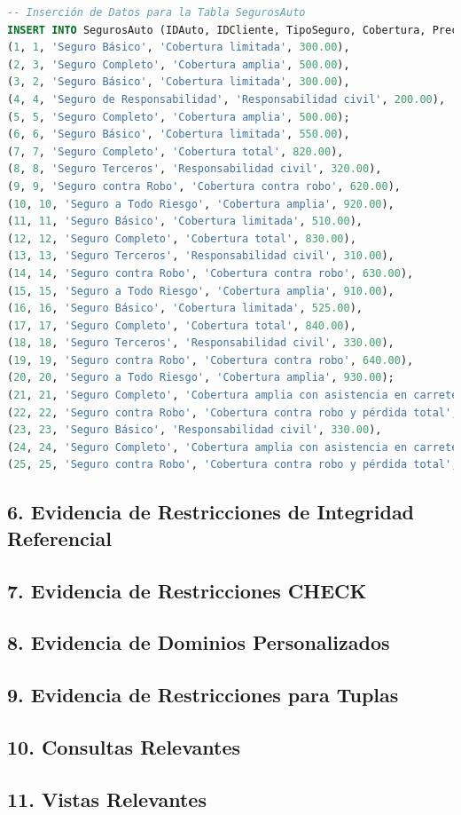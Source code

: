 \documentclass[12pt]{article}
\begin{document}
\begin{lstlisting}[language=SQL]
-- Inserción de Datos para la Tabla SegurosAuto
INSERT INTO SegurosAuto (IDAuto, IDCliente, TipoSeguro, Cobertura, Precio) VALUES
(1, 1, 'Seguro Básico', 'Cobertura limitada', 300.00),
(2, 3, 'Seguro Completo', 'Cobertura amplia', 500.00),
(3, 2, 'Seguro Básico', 'Cobertura limitada', 300.00),
(4, 4, 'Seguro de Responsabilidad', 'Responsabilidad civil', 200.00),
(5, 5, 'Seguro Completo', 'Cobertura amplia', 500.00);
(6, 6, 'Seguro Básico', 'Cobertura limitada', 550.00),
(7, 7, 'Seguro Completo', 'Cobertura total', 820.00),
(8, 8, 'Seguro Terceros', 'Responsabilidad civil', 320.00),
(9, 9, 'Seguro contra Robo', 'Cobertura contra robo', 620.00),
(10, 10, 'Seguro a Todo Riesgo', 'Cobertura amplia', 920.00),
(11, 11, 'Seguro Básico', 'Cobertura limitada', 510.00),
(12, 12, 'Seguro Completo', 'Cobertura total', 830.00),
(13, 13, 'Seguro Terceros', 'Responsabilidad civil', 310.00),
(14, 14, 'Seguro contra Robo', 'Cobertura contra robo', 630.00),
(15, 15, 'Seguro a Todo Riesgo', 'Cobertura amplia', 910.00),
(16, 16, 'Seguro Básico', 'Cobertura limitada', 525.00),
(17, 17, 'Seguro Completo', 'Cobertura total', 840.00),
(18, 18, 'Seguro Terceros', 'Responsabilidad civil', 330.00),
(19, 19, 'Seguro contra Robo', 'Cobertura contra robo', 640.00),
(20, 20, 'Seguro a Todo Riesgo', 'Cobertura amplia', 930.00);
(21, 21, 'Seguro Completo', 'Cobertura amplia con asistencia en carretera', 580.00),
(22, 22, 'Seguro contra Robo', 'Cobertura contra robo y pérdida total', 460.00),
(23, 23, 'Seguro Básico', 'Responsabilidad civil', 330.00),
(24, 24, 'Seguro Completo', 'Cobertura amplia con asistencia en carretera', 600.00),
(25, 25, 'Seguro contra Robo', 'Cobertura contra robo y pérdida total', 480.00);
    \end{lstlisting}    

    \subsection*{6. Evidencia de Restricciones de Integridad Referencial}

    \subsection*{7. Evidencia de Restricciones CHECK}
    
    \subsection*{8. Evidencia de Dominios Personalizados}
    
    \subsection*{9. Evidencia de Restricciones para Tuplas}
    
    \subsection*{10. Consultas Relevantes}
    
    \subsection*{11. Vistas Relevantes}
\end{document}
